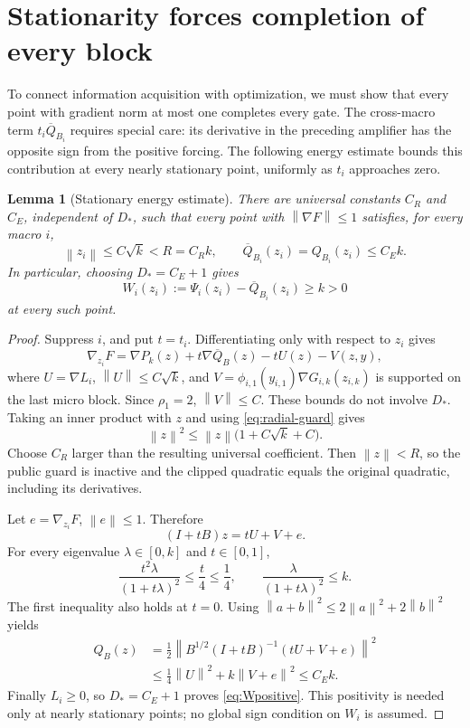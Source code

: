 \documentclass[11pt]{article}
\newtheorem{lemma}[theorem]{Lemma}
\theoremstyle{definition}
\theoremstyle{remark}
\newcommand{\norm}[1]{\left\|#1\right\|}
\begin{document}
\section{Stationarity forces completion of every block}\label{sec:stationarity}
To connect information acquisition with optimization, we must show
that every point with gradient norm at most one completes every gate.
The cross-macro term $t_i\overline Q_{B_i}$ requires special care:
its derivative in the preceding amplifier has the opposite sign from
the positive forcing. The following energy estimate bounds this
contribution at every nearly stationary point, uniformly as $t_i$
approaches zero.

\begin{lemma}[Stationary energy estimate]\label{lem:energy}
There are universal constants $C_R$ and $C_E$, independent of $D_*$, such that every point with $\norm{\nabla F}\le1$ satisfies, for every macro $i$,
\begin{equation}\label{eq:energy}
 \norm{z_i}\le C\sqrt k<R=C_Rk,
 \qquad \overline Q_{B_i}(z_i)=Q_{B_i}(z_i)\le C_Ek.
\end{equation}
In particular, choosing $D_*=C_E+1$ gives
\begin{equation}\label{eq:Wpositive}
 W_i(z_i):=\Psi_i(z_i)-\overline Q_{B_i}(z_i)\ge k>0
\end{equation}
at every such point.
\end{lemma}
\begin{proof}
Suppress $i$, and put $t=t_i$. Differentiating only with respect to $z_i$ gives
\[
 \nabla_{z_i}F=\nabla P_k(z)+t\nabla\overline Q_B(z)-tU(z)-V(z,y),
\]
where $U=\nabla L_i$, $\norm U\le C\sqrt k$, and
$V=\phi_{i,1}(y_{i,1})\nabla G_{i,k}(z_{i,k})$ is supported on the last micro block. Since $\rho_1=2$, $\norm V\le C$. These bounds do not involve $D_*$. Taking an inner product with $z$ and using \eqref{eq:radial-guard} gives
\[
 \norm z^2\le\norm z\big(1+C\sqrt k+C\big).
\]
Choose $C_R$ larger than the resulting universal coefficient. Then $\norm z<R$, so the public guard is inactive and the clipped quadratic equals the original quadratic, including its derivatives.

Let $e=\nabla_{z_i}F$, $\norm e\le1$. Therefore
\[
 (I+tB)z=tU+V+e.
\]
For every eigenvalue $\lambda\in[0,k]$ and $t\in[0,1]$,
\[
 \frac{t^2\lambda}{(1+t\lambda)^2}\le\frac{t}{4}\le\frac14,
 \qquad \frac{\lambda}{(1+t\lambda)^2}\le k.
\]
The first inequality also holds at $t=0$. Using
$\norm{a+b}^2\le2\norm a^2+2\norm b^2$ yields
\begin{align*}
 Q_B(z)&=\frac12\norm{B^{1/2}(I+tB)^{-1}(tU+V+e)}^2\\
 &\le\frac14\norm U^2+k\norm{V+e}^2\le C_Ek.
\end{align*}
Finally $L_i\ge0$, so $D_*=C_E+1$ proves \eqref{eq:Wpositive}.
This positivity is needed only at nearly stationary points; no global
sign condition on $W_i$ is assumed.
\end{proof}
\end{document}
